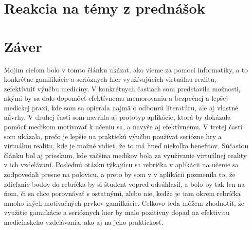 \documentclass[10pt,twoside,slovak,a4paper]{article}
\begin{document}
\section{Reakcia na témy z prednášok} \label{prednasky}


\section{Záver} \label{zaver} 
Mojim cieľom bolo v tomto článku ukázať, ako vieme za pomoci informatiky, a to konkrétne gamifikácie a serióznych hier využívajúcich virtuálnu realitu, zefektívniť výučbu medicíny. V konkrétnych častiach som predstavila možnosti, akými by sa dalo dopomôcť efektívnemu memorovaniu a bezpečnej a lepšej medickej praxi, kde som sa opierala najmä o odbonrú literatúru, ale aj vlastné návrhy. V druhej časti som navrhla aj prototyp aplikácie, ktorá by dokázala pomôcť medikom motivovať k učeniu sa, a navyše aj efektívnemu. V tretej časti som ukázala, prečo je lepšie na praktickú výučbu používať seriózne hry a virtuálnu realitu, kde je možné vidieť, že to má hneď niekoľko benefitov. Súčasťou článku bol aj prieskum, kde väčšina medikov bola za využívanie virtuálnej reality v ich vzdelávaní. Poslednú otázku týkajúcu sa rebríčka v aplikácii na učenie sa zodpovedali presne na polovicu, a preto by som v v aplikácii pozmenila to, že zdieľanie bodov do rebríčka by si študent vopred odsúhlasil, a bolo by tak len na ňom, či sa chce porovnávať s ostatnými, alebo nie, kedže je tam okrem rebríčka mnoho iných motivačných prvkov gamifkácie. Celkovo teda môžem zhodnotiť, že využitie gamifkácie a serióznych hier by malo pozitívny dopad na efektivitu medicínskeho vzdelávania, ako aj na jeho praktickosť.




\end{document}
